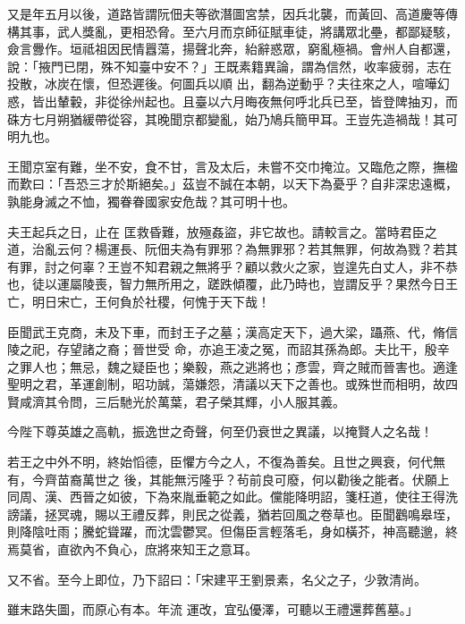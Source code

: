 \begin{pinyinscope}
 又是年五月以後，道路皆謂阮佃夫等欲潛圖宮禁，因兵北襲，而黃回、高道慶等傳構其事，武人獎亂，更相恐脅。至六月而京師征賦車徒，將講眾北壘，都鄙疑駭，僉言釁作。垣祗祖因民情囂蕩，揚聲北奔，紿辭惑眾，窮亂極禍。會州人自都還，說：「掖門已閉，殊不知臺中安不？」王既素籍異論，謂為信然，收率疲弱，志在投散，冰炭在懷，但恐遲後。何圖兵以順
 出，翻為逆動乎？夫往來之人，喧嘩幻惑，皆出輦轂，非從徐州起也。且臺以六月晦夜無何呼北兵已至，皆登陴抽刃，而硃方七月朔猶緩帶從容，其晚聞京都變亂，始乃鳩兵簡甲耳。王豈先造禍哉！其可明九也。



 王聞京室有難，坐不安，食不甘，言及太后，未嘗不交巾掩泣。又臨危之際，撫楹而歎曰：「吾恐三才於斯絕矣。」茲豈不誠在本朝，以天下為憂乎？自非深忠遠概，孰能身滅之不恤，獨眷眷國家安危哉？其可明十也。



 夫王起兵之日，止在
 匡救昏難，放殛姦盜，非它故也。請較言之。當時君臣之道，治亂云何？楊運長、阮佃夫為有罪邪？為無罪邪？若其無罪，何故為戮？若其有罪，討之何辜？王豈不知君親之無將乎？顧以救火之家，豈遑先白丈人，非不恭也，徒以運屬陵喪，智力無所用之，蹉跌傾覆，此乃時也，豈謂反乎？果然今日王亡，明日宋亡，王何負於社稷，何愧于天下哉！



 臣聞武王克商，未及下車，而封王子之墓；漢高定天下，過大梁，躡燕、代，脩信陵之祀，存望諸之裔；晉世受
 命，亦追王凌之冤，而詔其孫為郎。夫比干，殷辛之罪人也；無忌，魏之疑臣也；樂毅，燕之逃將也；彥雲，齊之賊而晉害也。適逢聖明之君，革運創制，昭功誠，蕩嫌怨，清議以天下之善也。或殊世而相明，故四賢咸濟其令問，三后馳光於萬葉，君子榮其輝，小人服其義。



 今陛下尊英雄之高軌，振逸世之奇聲，何至仍衰世之異議，以掩賢人之名哉！



 若王之中外不明，終始慆德，臣懼方今之人，不復為善矣。且世之興衰，何代無有，今齊苗裔萬世之
 後，其能無污隆乎？茍前良可廢，何以勸後之能者。伏願上同周、漢、西晉之如彼，下為來胤垂範之如此。儻能降明詔，箋枉道，使往王得洗謗議，拯冥魂，賜以王禮反葬，則民之從義，猶若回風之卷草也。臣聞鸛鳴皋垤，則降陰吐雨；騰蛇聳躍，而沈雲鬱冥。但傷臣言輕落毛，身如橫芥，神高聽邈，終焉莫省，直欲內不負心，庶將來知王之意耳。



 又不省。至今上即位，乃下詔曰：「宋建平王劉景素，名父之子，少敦清尚。



 雖末路失圖，而原心有本。年流
 運改，宜弘優澤，可聽以王禮還葬舊墓。」




\end{pinyinscope}
